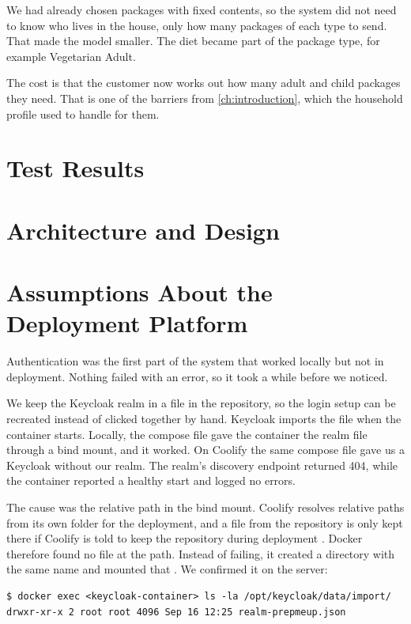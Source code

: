 We had already chosen packages with fixed contents, so the system did not need to know
who lives in the house, only how many packages of each type to send. That made the model
smaller. The diet became part of the package type, for example Vegetarian Adult.

The cost is that the customer now works out how many adult and child packages they
need. That is one of the barriers from \autoref{ch:introduction}, which the household
profile used to handle for them.

\section{Test Results}\label{sec:disc-test-results}

\section{Architecture and Design}\label{sec:disc-architecture}


\section{Assumptions About the Deployment Platform}\label{sec:deployment-assumptions}

Authentication was the first part of the system that worked locally but not in
deployment. Nothing failed with an error, so it took a while before we noticed.

We keep the Keycloak realm in a file in the repository, so the login setup can be
recreated instead of clicked together by hand. Keycloak imports the file when the
container starts. Locally, the compose file gave the container the realm file
through a bind mount, and it worked. On Coolify the same compose file gave us a
Keycloak without our realm. The realm's discovery endpoint returned 404, while the
container reported a healthy start and logged no errors.

The cause was the relative path in the bind mount. Coolify resolves relative paths
from its own folder for the deployment, and a file from the repository is only kept
there if Coolify is told to keep the repository during deployment
\cite{coolify-docker-compose}. Docker therefore found no file at the path. Instead of
failing, it created a directory with the same name and mounted that
\cite{coolify-docker-compose}. We confirmed it on the server:

\begin{verbatim}
$ docker exec <keycloak-container> ls -la /opt/keycloak/data/import/
drwxr-xr-x 2 root root 4096 Sep 16 12:25 realm-prepmeup.json
\end{verbatim}


